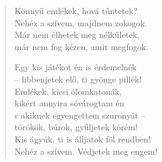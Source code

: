 \documentclass[11pt]{extbook}
\newcommand*{\centeredornament}{\centerline{\pgfornament[width=6cm]{88}}}
\begin{document}
\newpage

\vspace*{-15mm}
\centeredornament



\begin{verse}
  Könnyű emlékek, hová tűntetek? \\
  Nehéz a szívem, majdnem zokogok. \\
  Már nem élhetek meg nélkűletek, \\
  már nem fog kézen, amit megfogok.

  Egy kis játékot én is érdemelnék \\
  -- libbenjetek elő, ti gyönge pillék! \\
  Emlékek, kicsi ólomkatonák, \\
  kikért annyira sóvárogtam én \\
  s akiknek egyengettem szuronyát -- \\
  törökök, búrok, gyűljetek körém! \\
  Kis ágyúk, ti is álljatok föl rendben! \\
  Nehéz a szívem. Védjetek meg engem!
\end{verse}

\newpage


\vspace*{-15mm}
\centeredornament


\end{document}
